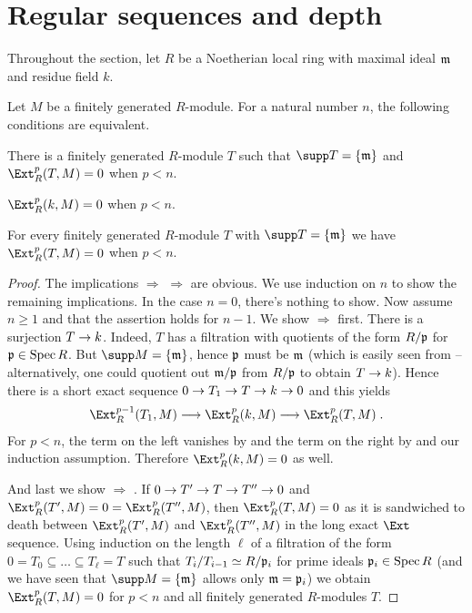 \documentclass[a4paper,parskip=half,numbers=enddot, DIV=12]{scrreprt}
\begin{document}
\section{Regular sequences and depth}
Throughout the section, let $R$ be a Noetherian local ring with maximal ideal $\mathfrak{m}$ and residue field $k$.
\begin{prop}
	Let $M$ be a finitely generated $R$-module. For a natural number $n$, the following conditions are equivalent.
	\begin{alphanumerate}
		\item There is a finitely generated $R$-module $T$ such that $\supp T=\{\mm\}$ and $\Ext_R^p(T,M)=0$ when $p<n$.
		\item $\Ext_R^p(k,M)=0$ when $p<n$.
		\item For every finitely generated $R$-module $T$ with $\supp T=\{\mm\}$ we have $\Ext_R^p(T,M)=0$ when $p<n$.
	\end{alphanumerate}
\end{prop}
\begin{proof}
	The implications  $\Rightarrow$  $\Rightarrow$  are obvious. We use induction on $n$ to show the remaining implications. In the case $n=0$, there's nothing to show. Now assume $n\geq 1$ and that the assertion holds for $n-1$. We show  $\Rightarrow$  first. There is a surjection $T\morphism k$. Indeed, $T$ has a filtration with quotients of the form $R/\mathfrak{p}$ for $\mathfrak{p}\in\operatorname{Spec} R$. But $\supp M=\{\mm\}$, hence $\mathfrak{p}$ must be $\mathfrak{m}$ (which is easily seen from \cite[Fact~3.1.2 and Lemma~3.1.4]{alg2} -- alternatively, one could quotient out $\mathfrak{m}/\mathfrak{p}$ from $R/\mathfrak{p}$ to obtain $T\morphism k$). Hence there is a short exact sequence $0\morphism T_1\morphism T\morphism k\morphism 0$ and this yields
	\begin{align*}
		\Ext_R^{p-1}(T_1,M)\morphism\Ext_R^p(k,M)\morphism\Ext_R^p(T,M)\;.
	\end{align*}
	For $p<n$, the term on the left vanishes by  and the term on the right by  and our induction assumption. Therefore $\Ext_R^p(k,M)=0$ as well.
	
	And last we show  $\Rightarrow$ . If $0\morphism T'\morphism T\morphism T''\morphism 0$ and $\Ext_R^p(T',M)=0=\Ext_R^p(T'',M)$, then $\Ext_R^p(T,M)=0$ as it is sandwiched to death between $\Ext_R^p(T',M)$ and $\Ext_R^p(T'',M)$ in the long exact $\Ext$ sequence. Using induction on the length $\ell$ of a filtration of the form $0=T_0\subseteq\ldots\subseteq T_\ell=T$ such that $T_i/T_{i-1}\simeq R/\mathfrak{p}_i$ for prime ideals $\mathfrak{p}_i\in\operatorname{Spec} R$ (and we have seen that $\supp M=\{\mm\}$ allows only $\mathfrak{m}=\mathfrak{p}_i$) we obtain $\Ext_R^p(T,M)=0$ for $p<n$ and all finitely generated $R$-modules $T$.
\end{proof}
\end{document}
